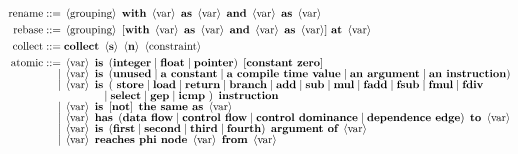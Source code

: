 \begin{minipage}{15cm}
\begin{align*}
\text{rename}      ::= {}&\left<\text{grouping}\right>\ \text{\bf with}\ \left<\text{var}\right>\ \text{\bf as}\ \left<\text{var}\right>\ { \text{\bf and}\ \left<\text{var}\right>\ \text{\bf as}\ \left<\text{var}\right> }\\
\text{rebase}      ::= {}&\left<\text{grouping}\right>\ [ \text{\bf with}\ \left<\text{var}\right>\ \text{\bf as}\ \left<\text{var}\right>\ { \text{\bf and}\ \left<\text{var}\right>\ \text{\bf as}\ \left<\text{var}\right> } ]\ \text{\bf at}\ \left<\text{var}\right>\\
\text{collect}     ::= {}&\text{\bf collect}\ \left<\text{\bf s}\right>\ \left<\text{\bf n}\right>\ \left<\text{constraint}\right>\\
\text{atomic} ::= {}&\left<\text{var}\right>\ \text{\bf is}\ \left(\text{\bf integer} \mid \text{\bf float} \mid \text{\bf pointer}\right)\ \left[\text{\bf constant zero}\right]\\[-5pt]
         \mid {}&\left<\text{var}\right>\ \text{\bf is}\ \left(\text{\bf unused} \mid \text{\bf a constant} \mid \text{\bf a compile time value} \mid \text{\bf an argument} \mid \text{\bf an instruction} \right)\\[-5pt]
         \mid {}&\left<\text{var}\right>\ \text{\bf is}\ \left(\ \text{\bf store} \mid \text{\bf load} \mid \text{\bf return} \mid \text{\bf branch} \mid \text{\bf add} \mid \text{\bf sub} \mid \text{\bf mul} \mid \text{\bf fadd} \mid \text{\bf fsub} \mid \text{\bf fmul} \mid \text{\bf fdiv} \right.\\[-5pt]
         &\hspace{3.4em}\left. \mid \text{\bf select} \mid \text{\bf gep} \mid \text{\bf icmp}\ \right)\ \text{\bf instruction}\\[-5pt]
         \mid {}&\left<\text{var}\right>\ \text{\bf is}\ \left[\text{\bf not}\right]\ \text{\bf the same as}\ \left<\text{var}\right>\\[-5pt]
         \mid {}&\left<\text{var}\right>\ \text{\bf has}\ \left(\text{\bf data flow} \mid \text{\bf control flow} \mid \text{\bf control dominance} \mid \text{\bf dependence edge} \right)\ \text{\bf to}\ \left<\text{var}\right>\\[-5pt]
         \mid {}&\left<\text{var}\right>\ \text{\bf is}\ \left(\text{\bf first} \mid \text{\bf second} \mid \text{\bf third} \mid \text{\bf fourth} \right)\ \text{\bf argument of}\ \left<\text{var}\right>\\[-5pt]
         \mid {}&\left<\text{var}\right>\ \text{\bf reaches phi node}\ \left<\text{var}\right>\ \text{\bf from}\ \left<\text{var}\right>\\[-5pt]

\end{align*}
\end{minipage}

